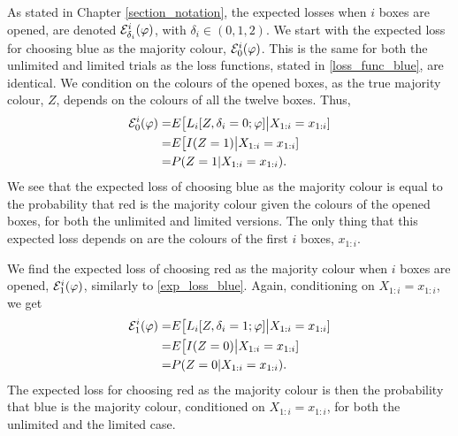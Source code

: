 As stated in Chapter \ref{section_notation}, the expected losses when $i$ boxes are opened, are denoted $\mathcal{E}_{\delta_i}^i(\varphi)$, with $\delta_i \in (0,1,2)$.
We start with the expected loss for choosing blue as the majority colour, $\mathcal{E}^i_0(\varphi)$. This is the same for both the unlimited and limited trials as the loss functions, stated in \eqref{loss_func_blue}, are identical. 
We condition on the colours of the opened boxes, as the true majority colour, $Z$, depends on the colours of all the twelve boxes. Thus,
\begin{equation}
\label{exp_loss_blue}
    \begin{aligned}
        \mathcal{E}^i_{0}(\varphi) = &E\big[ L_i[Z,\delta_i=0;\varphi] \big |X_{1:i}=x_{1:i} ]\\
        = & E \big[ I(Z=1) \big|X_{1:i}=x_{1:i}]\\
        = & P(Z=1|X_{1:i}=x_{1:i}).
    \end{aligned}
\end{equation}
We see that the expected loss of choosing blue as the majority colour is equal to the probability that red is the majority colour given the colours of the opened boxes, for both the unlimited and limited versions. The only thing that this expected loss depends on are the colours of the first $i$ boxes, $x_{1:i}$. 

We find the expected loss of choosing red as the majority colour when $i$ boxes are opened, $\mathcal{E}^i_{1}(\varphi)$, similarly to \eqref{exp_loss_blue}. Again, conditioning on $X_{1:i}=x_{1:i}$, we get
\begin{equation}
\label{exp_loss_red}
    \begin{aligned}
        \mathcal{E}^i_{1}(\varphi) 
        = &E\big[ L_i[Z,\delta_i=1;\varphi] \big |X_{1:i}=x_{1:i} ]\\
        = & E \big[ I(Z=0) \big|X_{1:i}=x_{1:i}]\\
        = & P(Z=0|X_{1:i}=x_{1:i}).
    \end{aligned}
\end{equation}
The expected loss for choosing red as the majority colour is then the probability that blue is the majority colour, conditioned on $X_{1:i}=x_{1:i}$, for both the unlimited and the limited case.

